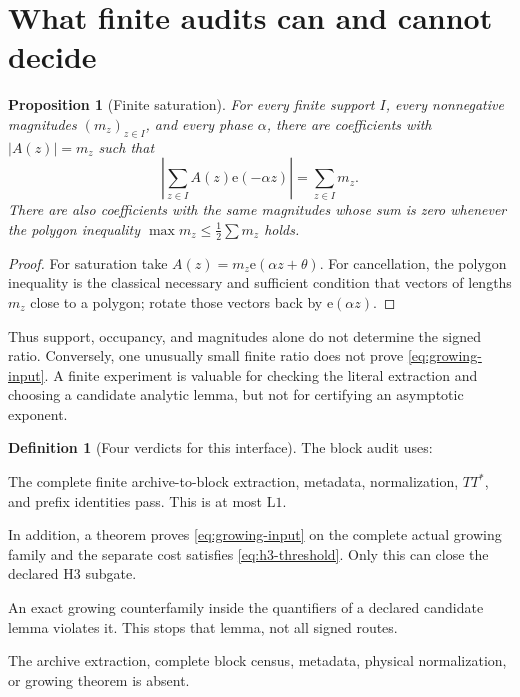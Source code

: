 \documentclass[11pt]{article}
\newtheorem{proposition}[theorem]{Proposition}
\theoremstyle{definition}
\newtheorem{definition}[theorem]{Definition}
\theoremstyle{remark}
\newcommand{\e}{\mathrm e}
\newcommand{\Lone}{\mathrm{L1}}
\newcommand{\GOI}{\textsc{go-interface}}
\newcommand{\GOH}{\textsc{go-h3}}
\newcommand{\STOP}{\textsc{stop-declared-route}}
\newcommand{\NT}{\textsc{not-testable}}
\begin{document}
\section{What finite audits can and cannot decide}

\begin{proposition}[Finite saturation]
\label{prop:saturation}
For every finite support \(I\), every nonnegative magnitudes
\((m_z)_{z\in I}\), and every phase \(\alpha\), there are coefficients
with \(|A(z)|=m_z\) such that
\[
 \left|\sum_{z\in I}A(z)\e(-\alpha z)\right|
 =\sum_{z\in I}m_z.
\]
There are also coefficients with the same magnitudes whose sum is
zero whenever the polygon inequality
\(\max m_z\le\frac12\sum m_z\) holds.
\end{proposition}

\begin{proof}
For saturation take \(A(z)=m_z\e(\alpha z+\theta)\).
For cancellation, the polygon inequality is the classical necessary
and sufficient condition that vectors of lengths \(m_z\) close to a
polygon; rotate those vectors back by \(\e(\alpha z)\).
\end{proof}

Thus support, occupancy, and magnitudes alone do not determine the
signed ratio.  Conversely, one unusually small finite ratio does not
prove \eqref{eq:growing-input}.  A finite experiment is valuable for
checking the literal extraction and choosing a candidate analytic
lemma, but not for certifying an asymptotic exponent.

\begin{definition}[Four verdicts for this interface]
The block audit uses:
\begin{description}[leftmargin=3.3cm,style=nextline,font=\normalfont]
\item[\(\GOI\)]
The complete finite archive-to-block extraction, metadata,
normalization, \(TT^*\), and prefix identities pass.  This is at most
\(\Lone\).
\item[\(\GOH\)]
In addition, a theorem proves \eqref{eq:growing-input} on the complete
actual growing family and the separate cost satisfies
\eqref{eq:h3-threshold}.  Only this can close the declared H3
subgate.
\item[\(\STOP\)]
An exact growing counterfamily inside the quantifiers of a declared
candidate lemma violates it.  This stops that lemma, not all signed
routes.
\item[\(\NT\)]
The archive extraction, complete block census, metadata, physical
normalization, or growing theorem is absent.
\end{description}
\end{definition}
\end{document}
